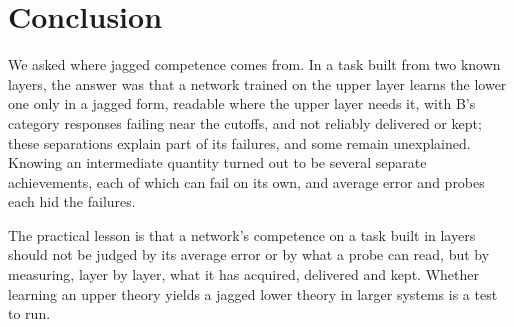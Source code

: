 \section{Conclusion}\label{sec:conclusion}

We asked where jagged competence comes from. In a task built from two known
layers, the answer was that a network trained on the upper layer learns the
lower one only in a jagged form, readable where the upper layer needs it,
with B's category responses failing near the cutoffs, and not reliably
delivered or kept; these separations explain part of its failures, and some
remain unexplained. Knowing an intermediate quantity
turned out to be several separate achievements, each of which can fail on its
own, and average error and probes each hid the failures.

The practical lesson is that a network's competence on a task built in
layers should not be judged by its average error or by what a probe can read,
but by measuring, layer by layer, what it has acquired, delivered and kept.
Whether learning an upper theory yields a jagged lower theory in larger
systems is a test to run.
